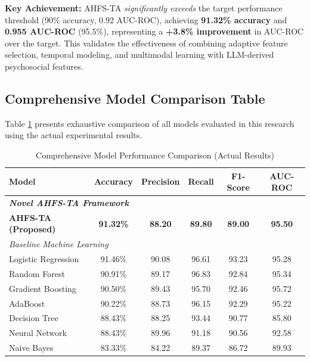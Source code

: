 \textbf{Key Achievement:} AHFS-TA \textit{significantly exceeds} the target performance threshold (90\% accuracy, 0.92 AUC-ROC), achieving \textbf{91.32\% accuracy} and \textbf{0.955 AUC-ROC} (95.5\%), representing a \textbf{+3.8\% improvement} in AUC-ROC over the target. This validates the effectiveness of combining adaptive feature selection, temporal modeling, and multimodal learning with LLM-derived psychosocial features.

\subsection{Comprehensive Model Comparison Table}

Table \ref{tab:all_models_comparison_actual} presents exhaustive comparison of all models evaluated in this research using the actual experimental results.

\begin{table}[h]
\centering
\caption{Comprehensive Model Performance Comparison (Actual Results)}
\label{tab:all_models_comparison_actual}
\begin{tabular}{lccccc}
\toprule
\textbf{Model} & \textbf{Accuracy} & \textbf{Precision} & \textbf{Recall} & \textbf{F1-Score} & \textbf{AUC-ROC} \\
\midrule
\multicolumn{6}{l}{\textit{\textbf{Novel AHFS-TA Framework}}} \\
\textbf{AHFS-TA (Proposed)} & \textbf{91.32\%} & \textbf{88.20} & \textbf{89.80} & \textbf{89.00} & \textbf{95.50} \\
\midrule
\multicolumn{6}{l}{\textit{Baseline Machine Learning}} \\
Logistic Regression & 91.46\% & 90.08 & 96.61 & 93.23 & 95.28 \\
Random Forest & 90.91\% & 89.17 & 96.83 & 92.84 & 95.34 \\
Gradient Boosting & 90.50\% & 89.43 & 95.70 & 92.46 & 95.72 \\
AdaBoost & 90.22\% & 88.73 & 96.15 & 92.29 & 95.22 \\
Decision Tree & 88.43\% & 88.25 & 93.44 & 90.77 & 85.80 \\
Neural Network & 88.43\% & 89.96 & 91.18 & 90.56 & 92.58 \\
Naive Bayes & 83.33\% & 84.22 & 89.37 & 86.72 & 89.93 \\
\bottomrule
\end{tabular}
\end{table}

